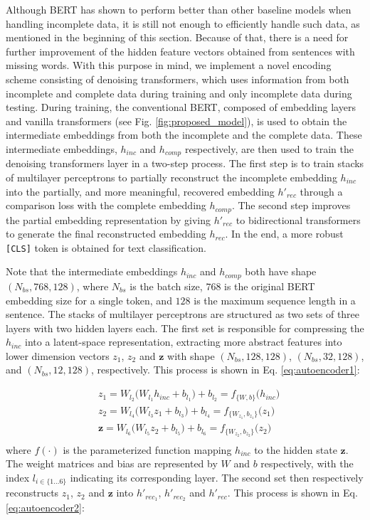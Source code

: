 \documentclass[review]{elsarticle}
\begin{document}
Although BERT has shown to perform better than other baseline models when handling incomplete data, it is still not enough to efficiently handle such data, as mentioned in the beginning of this section. Because of that, there is a need for further improvement of the hidden feature vectors obtained from sentences with missing words. With this purpose in mind, we implement a novel encoding scheme consisting of denoising transformers, which uses information from both incomplete and complete data during training and only incomplete data during testing. During training, the conventional BERT, composed of embedding layers and vanilla transformers (see Fig. \ref{fig:proposed_model}), is used to obtain the intermediate embeddings from both the incomplete and the complete data. These intermediate embeddings, $h_{inc}$ and $h_{comp}$ respectively, are then used to train the denoising transformers layer in a two-step process. The first step is to train stacks of multilayer perceptrons to partially reconstruct the incomplete embedding $h_{inc}$ into the partially, and more meaningful, recovered embedding $h'_{rec}$ through a comparison loss with the complete embedding $h_{comp}$. The second step improves the partial embedding representation by giving $h'_{rec}$ to bidirectional transformers to generate the final reconstructed embedding $h_{rec}$. In the end, a more robust \texttt{[CLS]} token is obtained for text classification.

Note that the intermediate embeddings $h_{inc}$ and $h_{comp}$ both have shape $(N_{bs}, 768, 128)$, where $N_{bs}$ is the batch size, $768$ is the original BERT embedding size for a single token, and $128$ is the maximum sequence length in a sentence. The stacks of multilayer perceptrons are structured as two sets of three layers with two hidden layers each. The first set is responsible for compressing the $h_{inc}$ into a latent-space representation, extracting more abstract features into lower dimension vectors $z_1$, $z_2$ and $\mathbf{z}$ with shape $(N_{bs}, 128, 128)$, $(N_{bs}, 32, 128)$, and $(N_{bs}, 12, 128)$, respectively. This process is shown in Eq. \eqref{eq:autoencoder1}:

\begin{equation} \label{eq:autoencoder1}
\begin{aligned}
&z_1 = W_{l_2} \big(W_{l_1} h_{inc} + b_{l_1}\big) + b_{l_2} = f_{\{W,b\}}\big(h_{inc}\big) \\
&z_2 = W_{l_4} \big(W_{l_3} z_1 + b_{l_3}\big) + b_{l_4} = f_{\{W_{z_1},b_{z_1}\}}\big(z_1\big) \\
&\mathbf{z} = W_{l_6} \big(W_{l_5} z_2 + b_{l_5}\big) + b_{l_6} = f_{\{W_{z_2},b_{z_2}\}}\big(z_2\big) \\
\end{aligned}
\end{equation}
where $f(\cdot)$ is the parameterized function mapping $h_{inc}$ to the hidden state $\mathbf{z}$. The weight matrices and bias are represented by $W$ and $b$ respectively, with the index $l_{i \in \{1\dots6\}}$ indicating its corresponding layer. The second set then respectively reconstructs $z_1$, $z_2$ and $\mathbf{z}$ into $h'_{rec_1}$, $h'_{rec_2}$ and $h'_{rec}$. This process is shown in Eq. \eqref{eq:autoencoder2}:
\end{document}
